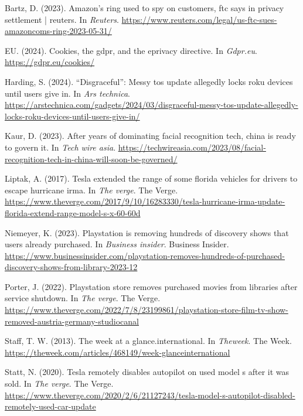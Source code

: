 \documentclass[11pt]{article}
\begin{document}
\begin{hangparas}{1.5em}{1}
\hypertarget{citeproc_bib_item_1}{Bartz, D. (2023). Amazon’s ring used to spy on customers, ftc says in privacy settlement | reuters. In \textit{Reuters}. \url{https://www.reuters.com/legal/us-ftc-sues-amazoncoms-ring-2023-05-31/}}

\hypertarget{citeproc_bib_item_2}{EU. (2024). Cookies, the gdpr, and the eprivacy directive. In \textit{Gdpr.eu}. \url{https://gdpr.eu/cookies/}}

\hypertarget{citeproc_bib_item_3}{Harding, S. (2024). “Disgraceful”: Messy tos update allegedly locks roku devices until users give in. In \textit{Ars technica}. \url{https://arstechnica.com/gadgets/2024/03/disgraceful-messy-tos-update-allegedly-locks-roku-devices-until-users-give-in/}}

\hypertarget{citeproc_bib_item_4}{Kaur, D. (2023). After years of dominating facial recognition tech, china is ready to govern it. In \textit{Tech wire asia}. \url{https://techwireasia.com/2023/08/facial-recognition-tech-in-china-will-soon-be-governed/}}

\hypertarget{citeproc_bib_item_5}{Liptak, A. (2017). Tesla extended the range of some florida vehicles for drivers to escape hurricane irma. In \textit{The verge}. The Verge. \url{https://www.theverge.com/2017/9/10/16283330/tesla-hurricane-irma-update-florida-extend-range-model-s-x-60-60d}}

\hypertarget{citeproc_bib_item_6}{Niemeyer, K. (2023). Playstation is removing hundreds of discovery shows that users already purchased. In \textit{Business insider}. Business Insider. \url{https://www.businessinsider.com/playstation-removes-hundreds-of-purchased-discovery-shows-from-library-2023-12}}

\hypertarget{citeproc_bib_item_7}{Porter, J. (2022). Playstation store removes purchased movies from libraries after service shutdown. In \textit{The verge}. The Verge. \url{https://www.theverge.com/2022/7/8/23199861/playstation-store-film-tv-show-removed-austria-germany-studiocanal}}

\hypertarget{citeproc_bib_item_8}{Staff, T. W. (2013). The week at a glance.international. In \textit{Theweek}. The Week. \url{https://theweek.com/articles/468149/week-glanceinternational}}

\hypertarget{citeproc_bib_item_9}{Statt, N. (2020). Tesla remotely disables autopilot on used model s after it was sold. In \textit{The verge}. The Verge. \url{https://www.theverge.com/2020/2/6/21127243/tesla-model-s-autopilot-disabled-remotely-used-car-update}}


\end{hangparas}
\end{document}
